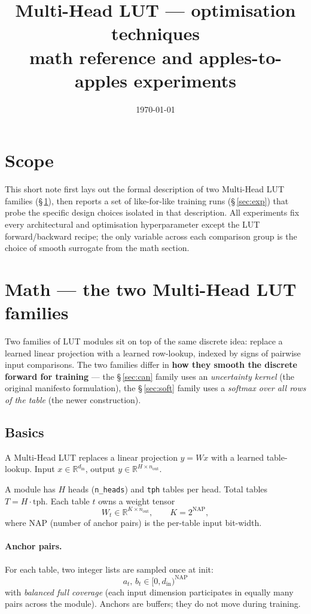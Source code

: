 \documentclass[11pt]{article}
\title{\textbf{Multi-Head LUT --- optimisation techniques\\
\large math reference and apples-to-apples experiments}}
\author{}
\date{\today}
\begin{document}
\maketitle

\section*{Scope}

This short note first lays out the formal description of two Multi-Head
LUT families (\S\,\ref{sec:math}), then reports a set of like-for-like
training runs (\S\,\ref{sec:exp}) that probe the specific design choices
isolated in that description. All experiments fix every architectural and
optimisation hyperparameter except the LUT forward/backward recipe;
the only variable across each comparison group is the choice of smooth
surrogate from the math section.

\section{Math --- the two Multi-Head LUT families}\label{sec:math}

Two families of LUT modules sit on top of the same discrete idea: replace a
learned linear projection with a learned row-lookup, indexed by signs of
pairwise input comparisons. The two families differ in \textbf{how they
smooth the discrete forward for training} --- the \S\,\ref{sec:can} family
uses an \emph{uncertainty kernel} (the original manifesto formulation),
the \S\,\ref{sec:soft} family uses a \emph{softmax over all rows of the
table} (the newer construction).

\subsection{Basics}\label{sec:basics}

A Multi-Head LUT replaces a linear projection $y=Wx$ with a learned
table-lookup. Input $x\in\mathbb{R}^{d_{\mathrm{in}}}$, output
$y\in\mathbb{R}^{H\times n_{\mathrm{out}}}$.

A module has $H$ heads (\texttt{n\_heads}) and \texttt{tph} tables per head.
Total tables $T=H\cdot\mathrm{tph}$. Each table $t$ owns a weight tensor
\[
  W_t\in\mathbb{R}^{K\times n_{\mathrm{out}}},\qquad K=2^{\mathrm{NAP}},
\]
where NAP (number of anchor pairs) is the per-table input bit-width.

\paragraph{Anchor pairs.} For each table, two integer lists are sampled once
at init:
\[
  a_t,\,b_t\in[0,d_{\mathrm{in}})^{\mathrm{NAP}}
\]
with \emph{balanced full coverage} (each input dimension participates in
equally many pairs across the module). Anchors are buffers; they do not
move during training.
\end{document}
